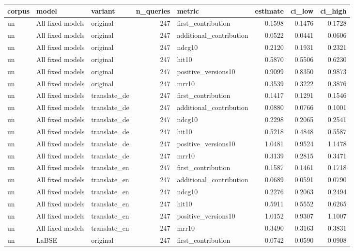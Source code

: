 \begin{tabular}{lllrlrrr}
\toprule
corpus & model & variant & n\_queries & metric & estimate & ci\_low & ci\_high \\
\midrule
un & All fixed models & original & 247 & first\_contribution & 0.1598 & 0.1476 & 0.1728 \\
un & All fixed models & original & 247 & additional\_contribution & 0.0522 & 0.0441 & 0.0606 \\
un & All fixed models & original & 247 & ndcg10 & 0.2120 & 0.1931 & 0.2321 \\
un & All fixed models & original & 247 & hit10 & 0.5870 & 0.5506 & 0.6230 \\
un & All fixed models & original & 247 & positive\_versions10 & 0.9099 & 0.8350 & 0.9873 \\
un & All fixed models & original & 247 & mrr10 & 0.3539 & 0.3222 & 0.3876 \\
un & All fixed models & translate\_de & 247 & first\_contribution & 0.1417 & 0.1291 & 0.1546 \\
un & All fixed models & translate\_de & 247 & additional\_contribution & 0.0880 & 0.0766 & 0.1001 \\
un & All fixed models & translate\_de & 247 & ndcg10 & 0.2298 & 0.2065 & 0.2541 \\
un & All fixed models & translate\_de & 247 & hit10 & 0.5218 & 0.4848 & 0.5587 \\
un & All fixed models & translate\_de & 247 & positive\_versions10 & 1.0481 & 0.9524 & 1.1478 \\
un & All fixed models & translate\_de & 247 & mrr10 & 0.3139 & 0.2815 & 0.3471 \\
un & All fixed models & translate\_en & 247 & first\_contribution & 0.1587 & 0.1461 & 0.1718 \\
un & All fixed models & translate\_en & 247 & additional\_contribution & 0.0689 & 0.0591 & 0.0790 \\
un & All fixed models & translate\_en & 247 & ndcg10 & 0.2276 & 0.2063 & 0.2494 \\
un & All fixed models & translate\_en & 247 & hit10 & 0.5911 & 0.5552 & 0.6265 \\
un & All fixed models & translate\_en & 247 & positive\_versions10 & 1.0152 & 0.9307 & 1.1007 \\
un & All fixed models & translate\_en & 247 & mrr10 & 0.3490 & 0.3163 & 0.3831 \\
un & LaBSE & original & 247 & first\_contribution & 0.0742 & 0.0590 & 0.0908 \\

\end{tabular}

